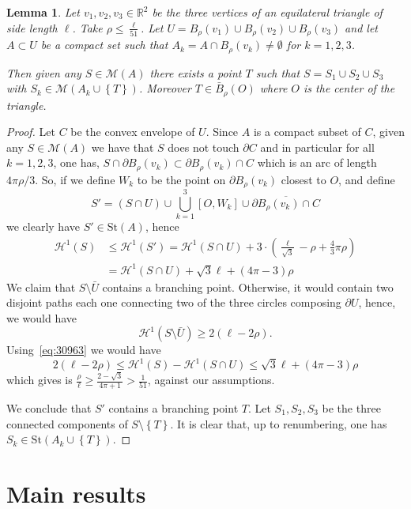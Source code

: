 \documentclass{amsart}
\newcommand{\RR}{\mathbb R}
\renewcommand{\H}{\mathcal H}
\newcommand{\enclose}[1]{\left(#1\right)}
\newcommand{\ENCLOSE}[1]{\left\{#1\right\}}
\newcommand{\St}{\mathrm{St}}
\newcommand{\M}{\mathcal{M}}
\renewcommand{\H}{\mathcal{H}}
\newtheorem{lemma}[theorem]{Lemma}
\theoremstyle{definition}
\theoremstyle{remark}
\begin{document}
\begin{lemma}\label{lemma:triple}
  Let $v_1,v_2,v_3\in \RR^2$ be the three vertices of an 
  equilateral triangle of side length $\ell$. 
  Take $\rho \le \frac{\ell}{51}$.
  Let $U = B_\rho(v_1)\cup B_\rho(v_2)\cup B_\rho(v_3)$ 
  and let $A\subset U$
  be a compact set 
  such that $A_k=A\cap B_\rho(v_k) \neq \emptyset$
  for $k=1,2,3$.

  Then given any $S\in \M(A)$ there exists a point $T$ such 
  that $S=S_1\cup S_2 \cup S_3$ with $S_k\in \M(A_k\cup\ENCLOSE{T})$.
  Moreover $T\in \bar B_\rho(O)$ where $O$ is the center of the triangle.
\end{lemma}
  
\begin{proof}
Let $C$ be the convex envelope of $U$.
Since $A$ is a compact subset of $C$, given any $S\in \M(A)$ we have 
that $S$ does not touch $\partial C$ and in particular 
for all $k=1,2,3$, one has,
$S\cap \partial B_\rho(v_k) \subset \partial B_\rho(v_k) \cap C$ which 
is an arc of length $4\pi \rho/3$.
So, if we define $W_k$ to be the point on $\partial B_\rho(v_k)$ closest to $O$,
and define
\[
  S' = (S\cap U) \cup \bigcup_{k=1}^3 [O,W_k]\cup \overline{\partial B_\rho(v_k)\cap C}
\]
we clearly have $S'\in \St (A)$, 
hence
\begin{align}\label{eq:30963}
  \H^1(S) &\le \H^1(S') = \H^1(S\cap U) + 3\cdot \enclose{\frac {\ell}{\sqrt 3}-\rho + \frac 4 3 \pi \rho} \\
  &= \H^1(S\cap U) + \sqrt 3 \ell + (4\pi-3) \rho
\end{align}
We claim that $S\setminus \bar U$ contains a branching point. 
Otherwise, it would contain two disjoint paths each one connecting 
two of the three circles composing $\partial U$, hence, we would have 
\[
  \H^1(S \setminus \bar U) \ge 2(\ell-2\rho).
\]
Using~\eqref{eq:30963} we would have
\[
  2(\ell-2\rho) \le \H^1(S) - \H^1(S\cap U) \le \sqrt 3 \ell+(4\pi-3)\rho
\]
which gives is $\frac{\rho}{\ell} \ge \frac{2-\sqrt 3}{4\pi+1} > \frac{1}{51}$,
against our assumptions.

We conclude that $S'$ contains a branching point $T$. 
Let $S_1,S_2,S_3$ be the three connected components of $S\setminus \ENCLOSE{T}$.
It is clear that, up to renumbering,
one has $S_k \in \St(A_k\cup \ENCLOSE{T})$.
\end{proof}

\section{Main results}
\label{sec:main}
\end{document}
